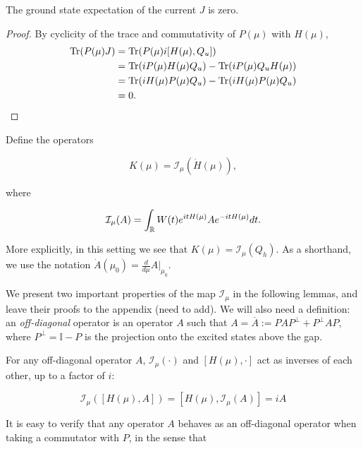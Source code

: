 \documentclass[12pt, letterpaper]{article}
\begin{document}


\begin{lemma}
The ground state expectation of the current $J$ is zero.
\label{lemma:J=0}
\end{lemma}
\begin{proof}
By cyclicity of the trace and commutativity of $P(\mu)$ with $H(\mu)$, 
\[\begin{aligned}
\text{Tr}(P(\mu) J) &= \text{Tr}(P(\mu)i[H(\mu),Q_u]) \\
&= \text{Tr}(iP(\mu)H(\mu)Q_u) - \text{Tr}(iP(\mu)Q_u H(\mu))\\
&= \text{Tr}(iH(\mu)P(\mu)Q_u) - \text{Tr}(iH(\mu)P(\mu)Q_u)\\
&=0.
\end{aligned}\]
\end{proof}

Define the operators

\[K(\mu) = \mathcal{I}_{\mu}(\dot{H}(\mu)),\]

where 

\[\mathcal{I}_{\mu} (A) = \int_{\mathbb{R}} W(t) e^{itH(\mu)} A e^{-itH(\mu)}dt.\]

More explicitly, in this setting we see that $K(\mu) = \mathcal{I}_\mu(Q_h)$. As a shorthand, we use the notation $\dot{A}(\mu_0)= \frac{d}{d\mu}A|_{\mu_0}$. 

We present two important properties of the map $\mathcal{I}_\mu$ in the following lemmas, and leave their proofs to the appendix (need to add). We will also need a definition: an \emph{off-diagonal} operator is an operator $A$ such that $A = \overline{A} := PAP^\perp + P^\perp AP$, where $P^\perp = \mathbb{I} - P$ is the projection onto the excited states above the gap.

\begin{lemma}
For any off-diagonal operator $A$, $\mathcal{I}_\mu(\cdot)$ and $[H(\mu), \cdot]$ act as inverses of each other, up to a factor of $i$:

\[\mathcal{I}_\mu\left([H(\mu), A]\right) = [H(\mu), \mathcal{I}_\mu(A)] = iA\]
\label{lemma:inverseofH}
\end{lemma}

It is easy to verify that any operator $A$ behaves as an off-diagonal operator when taking a commutator with $P$, in the sense that
\end{document}
